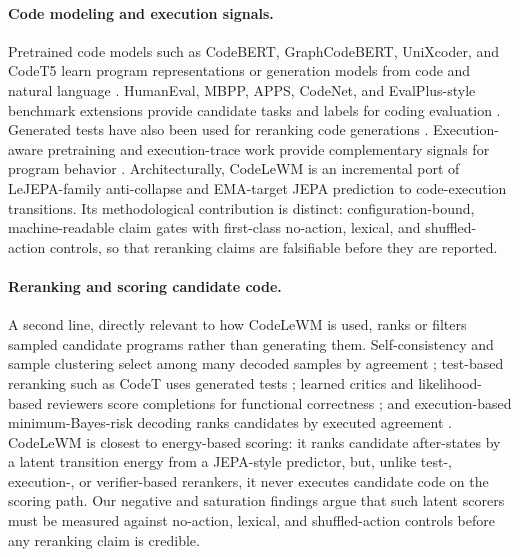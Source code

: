 \documentclass[11pt]{article}
\newcommand{\modelname}{CodeLeWM}
\begin{document}
\paragraph{Code modeling and execution signals.}
Pretrained code models such as CodeBERT, GraphCodeBERT, UniXcoder, and CodeT5
learn program representations or generation models from code and natural
language
\citep{feng2020codebertpretrainedmodelprogramming,guo2021graphcodebertpretrainingcoderepresentations,guo2022unixcoderunifiedcrossmodalpretraining,wang2021codet5identifierawareunifiedpretrained}.
HumanEval, MBPP, APPS, CodeNet, and EvalPlus-style benchmark extensions provide
candidate tasks and labels for coding evaluation
\citep{chen2021evaluatinglargelanguagemodels,austin2021programsynthesislargelanguage,hendrycks2021measuringcodingchallengecompetence,puri2021codenetlargescaleaicode,liu2023codegeneratedchatgptreally}.
Generated tests have also been used for reranking code generations
\citep{chen2022codetcodegenerationgenerated}. Execution-aware pretraining and
execution-trace work provide complementary signals for program behavior
\citep{zaremba2015learningexecute,ding2023tracedexecutionawarepretrainingsource,armengolestape2025iexecuteiunderstand}.
Architecturally, \modelname{} is an incremental port of LeJEPA-family
anti-collapse and EMA-target JEPA prediction to code-execution transitions. Its
methodological contribution is distinct: configuration-bound, machine-readable claim
gates with first-class no-action, lexical, and shuffled-action controls, so that
reranking claims are falsifiable before they are reported.

\paragraph{Reranking and scoring candidate code.}
A second line, directly relevant to how \modelname{} is used, ranks or filters
sampled candidate programs rather than generating them. Self-consistency and
sample clustering select among many decoded samples by agreement
\citep{wang2022selfconsistencyimproveschainofthought,li2022competitionlevelcodegenerationalphacode};
test-based reranking such as CodeT uses generated tests
\citep{chen2022codetcodegenerationgenerated}; learned critics and
likelihood-based reviewers score completions for functional correctness
\citep{le2022coderlmasteringcodegeneration,zhang2022coderreviewerrerankingcodegeneration};
and execution-based minimum-Bayes-risk decoding ranks candidates by executed
agreement \citep{shi2022naturallanguagecodetranslationexecution}. \modelname{} is
closest to energy-based scoring: it ranks candidate after-states by a latent
transition energy from a JEPA-style predictor, but, unlike test-, execution-, or
verifier-based rerankers, it never executes candidate code on the scoring path.
Our negative and saturation findings argue that such latent scorers must be
measured against no-action, lexical, and shuffled-action controls before any
reranking claim is credible.
\end{document}
